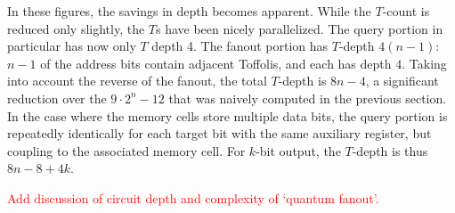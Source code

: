 \documentclass[a4paper,12pt]{article}
\newcommand\todo[1]{\textcolor{red}{#1}}
\begin{document}
In these figures, the savings in depth becomes apparent.
While the $T$-count is reduced only slightly, the $T$s have been nicely parallelized.
The query portion in particular has now only $T$ depth 4.
The fanout portion has $T$-depth $4(n-1)$: $n - 1$ of the address bits contain adjacent Toffolis, and each has depth $4$.
Taking into account the reverse of the fanout, the total $T$-depth is $8n - 4$, a significant reduction over the $9 \cdot 2^n - 12$ that was naively computed in the previous section.
In the case where the memory cells store multiple data bits, the query portion is repeatedly identically for each target bit with the same auxiliary register, but coupling to the associated memory cell. 
For $k$-bit output, the $T$-depth is thus $8n - 8 + 4k$.

\todo{Add discussion of circuit depth and complexity of `quantum fanout'.}
\end{document}
